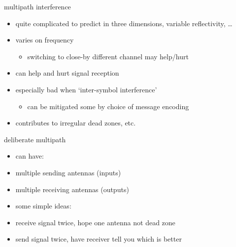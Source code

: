 \begin{frame}{multipath interference}
    \begin{itemize}
    \item quite complicated to predict in three dimensions, variable reflectivity, \ldots
    \item varies on frequency
        \begin{itemize}
        \item switching to close-by different channel may help/hurt
        \end{itemize}
    \item can help and hurt signal reception
    \item especially bad when `inter-symbol interference'
        \begin{itemize}
        \item can be mitigated some by choice of message encoding
        \end{itemize}
    \vspace{.5cm}
    \item contributes to irregular dead zones, etc.
    \end{itemize}
\end{frame}

\begin{frame}{deliberate multipath}
    \begin{itemize}
    \item can have:
    \item multiple sending antennas (inputs)
    \item multiple receiving antennas (outputs)
    \item some simple ideas:
    \vspace{.5cm}
    \item receive signal twice, hope one antenna not dead zone
    \item send signal twice, have receiver tell you which is better
    \end{itemize}
\end{frame}

